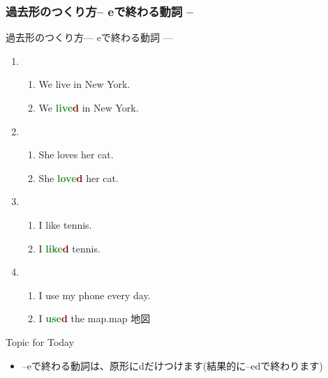 \documentclass[aspectratio=169,xcolor={dvipsnames,table}]{beamer}
\newcommand{\myaudio}[1]{\href{#1}{\faVolumeUp}}
\begin{document}
\subsubsection{過去形のつくり方-- eで終わる動詞 --}
\begin{frame}[plain]{過去形のつくり方--- eで終わる動詞 ---}
 
\begin{enumerate}
 \item \begin{enumerate}
	\item We live in New York.\pause
	\item We \textcolor{ForestGreen}{\bfseries live}\textcolor{Maroon}{\bfseries d} in New York.\pause
       \end{enumerate}
 \item \begin{enumerate}
	\item She loves her cat.\pause
	\item She  \textcolor{ForestGreen}{\bfseries love}\textcolor{Maroon}{\bfseries d} her cat.\pause
       \end{enumerate} \item \begin{enumerate}
	\item I like tennis.\pause
	\item I  \textcolor{ForestGreen}{\bfseries like}\textcolor{Maroon}{\bfseries d} tennis.\pause
       \end{enumerate}
 \item \begin{enumerate}
	\item I use my phone every day.\pause
	\item I  \textcolor{ForestGreen}{\bfseries use}\textcolor{Maroon}{\bfseries d} the map.\hfill{{{\scriptsize map  地図}}}\pause
       \end{enumerate}
\end{enumerate}

\begin{exampleblock}{Topic for Today}\small
\begin{itemize}[square]
 \item --eで終わる動詞は、原形にdだけつけます(結果的に--edで終わります)
\end{itemize}
\end{exampleblock}

\hfill\myaudio{./audio/025_past_do_05.mp3}

\end{frame}
\end{document}
